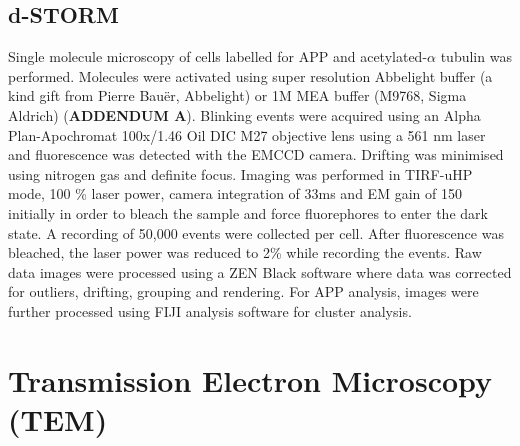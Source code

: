 \subsection{d-STORM}
Single molecule microscopy of cells labelled for APP and acetylated-$\alpha$ tubulin was performed. Molecules were activated using super resolution Abbelight buffer (a kind gift from Pierre Bauër, Abbelight) or 1M MEA buffer (M9768, Sigma Aldrich) (\textbf{ADDENDUM A}). Blinking events were acquired using an Alpha Plan-Apochromat 100x/1.46 Oil DIC M27 objective lens using a 561 nm laser and fluorescence was detected with the EMCCD camera. Drifting was minimised using nitrogen gas and definite focus. Imaging was performed in TIRF-uHP mode, 100 \% laser power, camera integration of 33ms and EM gain of 150 initially in order to bleach the sample and force fluorephores to enter the dark state. A recording of 50,000 events were collected per cell. After fluorescence was bleached, the laser power was reduced to 2\% while recording the events. Raw data images were processed using a ZEN Black software where data was corrected for outliers, drifting, grouping and rendering. For APP analysis, images were further processed using FIJI analysis software for cluster analysis. 

\section{Transmission Electron Microscopy (TEM)}
